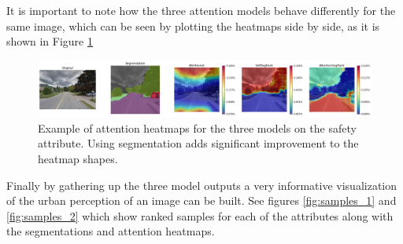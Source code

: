 It is important to note how the three attention models behave differently for the same image, which can be seen by
plotting the heatmaps side by side, as it is shown in Figure \ref{fig:model_comparison}

\begin{figure}[ht]
	\begin{center}
	\includegraphics[width=1\textwidth]{./figures/model_comparison.png}
	\caption[Attention by segmentation class heatmaps.]{
		Example of attention heatmaps for the three models on the safety attribute.
		Using segmentation adds significant improvement to the heatmap shapes.
        }
	\label{fig:model_comparison}
	\end{center}
\end{figure}

Finally by gathering up the three model outputs a very informative
visualization of the urban perception of an image can be built.
See figures \ref{fig:samples_1} and \ref{fig:samples_2} which show ranked
samples for each of the attributes along with the segmentations and attention
heatmaps.

